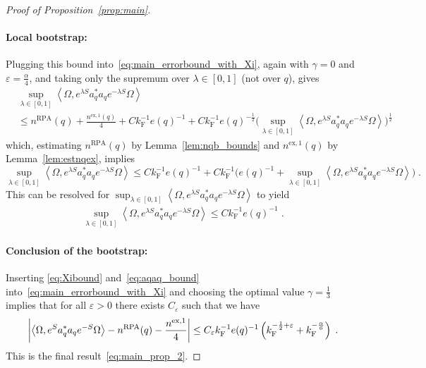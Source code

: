 \documentclass[12pt,a4paper]{article}
\numberwithin{equation}{section}
\newcommand{\1}{\mathbb{I}}
\newcommand{\ex}{\mathrm{ex}}
\newcommand{\F}{\mathrm{F}}
\newcommand{\RPA}{\mathrm{RPA}}
\newcommand{\kF}{k_\F}
\newcommand{\half}{\frac{1}{2}}
\newcommand{\eva}[1]{\left\langle #1 \right\rangle}
\theoremstyle{plain}
\theoremstyle{definition}
\theoremstyle{remark}
\theoremstyle{plain}
\theoremstyle{definition}
\theoremstyle{remark}
\begin{document}
\begin{proof}[Proof of Proposition~\ref{prop:main}]
\paragraph{Local bootstrap:} Plugging this bound into~\eqref{eq:main_errorbound_with_Xi}, again with $\gamma=0$ and $\varepsilon = \frac{\alpha}{4}$, and taking only the supremum over $ \lambda \in [0,1] $ (not over $q$), gives
\begin{align}
	&\sup_{\lambda \in [0,1]} \eva{\Omega, e^{\lambda S} a_q^* a_q e^{-\lambda S} \Omega} \nonumber\\
	&\le n^{\RPA}(q) + \frac{n^{\ex,1}(q)}{4}
	+ C \kF^{-1} e(q)^{-1}
		+ C \kF^{-1} e(q)^{-\half} \Big(\sup_{\lambda \in [0,1]} \eva{\Omega, e^{\lambda S} a_q^* a_q e^{-\lambda S} \Omega} \Big)^{\half}
\end{align}
which, estimating $ n^{\RPA}(q) $ by Lemma~\ref{lem:nqb_bounds}  and $n^{\ex,1}(q)$ by Lemma~\ref{lem:estnqex}, implies
\begin{displaymath}
	\sup_{\lambda \in [0,1]} \eva{\Omega, e^{\lambda S} a_q^* a_q e^{-\lambda S} \Omega}
	\le
	C \kF^{-1} e(q)^{-1}
		+ C \kF^{-1} \Big( e(q)^{-1}  + \sup_{\lambda \in [0,1]} \eva{\Omega, e^{\lambda S} a_q^* a_q e^{-\lambda S} \Omega} \Big) \;.
\end{displaymath}
This can be resolved for $\sup_{\lambda \in [0,1]} \eva{\Omega, e^{\lambda S} a_q^* a_q e^{-\lambda S} \Omega}$ to yield
\begin{align}\label{eq:aqaq_bound}
	\sup_{\lambda \in [0,1]} \eva{\Omega, e^{\lambda S} a_q^* a_q e^{-\lambda S} \Omega}
	\leq C \kF^{-1} e(q)^{-1} \;.
\end{align}

\paragraph{Conclusion of the bootstrap:} Inserting \eqref{eq:Xibound} and~\eqref{eq:aqaq_bound} into~\eqref{eq:main_errorbound_with_Xi} and choosing the optimal value $ \gamma = \frac 13 $ implies that for all $\varepsilon > 0$ there exists $C_\varepsilon$ such that we have
\begin{align}
	\abs{\eva{\Omega, e^{S} a_q^* a_q e^{-S} \Omega} - n^{\textnormal{RPA}}(q) -\frac{n^{\ex,1}}{4}} \le C_\varepsilon
		\kF^{-1} e(q)^{-1}\left( \kF^{-\frac{1}{2} + \varepsilon}
		+ \kF^{- \frac{\alpha}{6}}\right) \;.
\end{align}
This is the final result~\eqref{eq:main_prop_2}.


\end{proof}
\end{document}
